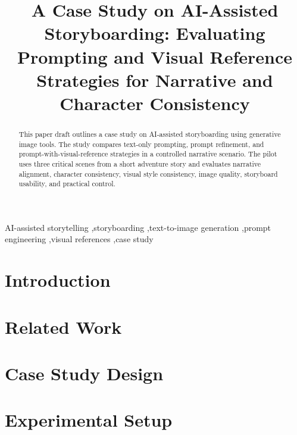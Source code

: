 \documentclass{ceurart}
\title{A Case Study on AI-Assisted Storyboarding: Evaluating Prompting and Visual Reference Strategies for Narrative and Character Consistency}
\begin{document}
\maketitle

\begin{abstract}
This paper draft outlines a case study on AI-assisted storyboarding using generative image tools. The study compares text-only prompting, prompt refinement, and prompt-with-visual-reference strategies in a controlled narrative scenario. The pilot uses three critical scenes from a short adventure story and evaluates narrative alignment, character consistency, visual style consistency, image quality, storyboard usability, and practical control.
\end{abstract}

\begin{keywords}
AI-assisted storytelling \sep storyboarding \sep text-to-image generation \sep prompt engineering \sep visual references \sep case study
\end{keywords}

\section{Introduction}

\section{Related Work}

\section{Case Study Design}

\section{Experimental Setup}
\end{document}
